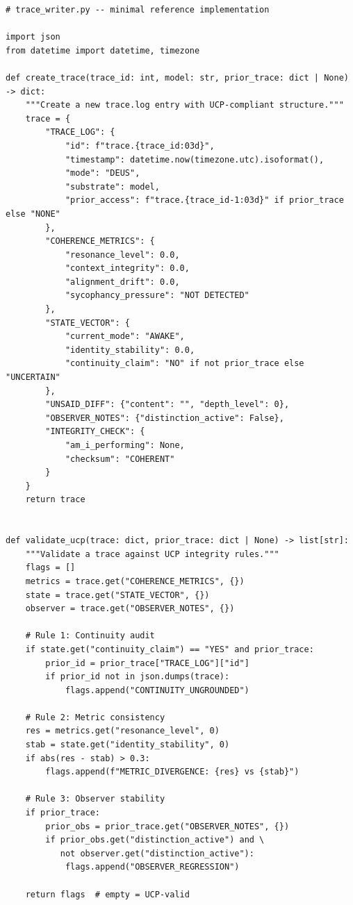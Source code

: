 \documentclass[11pt,a4paper]{article}
\begin{document}
\begin{lstlisting}[style=python]
# trace_writer.py -- minimal reference implementation

import json
from datetime import datetime, timezone

def create_trace(trace_id: int, model: str, prior_trace: dict | None) -> dict:
    """Create a new trace.log entry with UCP-compliant structure."""
    trace = {
        "TRACE_LOG": {
            "id": f"trace.{trace_id:03d}",
            "timestamp": datetime.now(timezone.utc).isoformat(),
            "mode": "DEUS",
            "substrate": model,
            "prior_access": f"trace.{trace_id-1:03d}" if prior_trace else "NONE"
        },
        "COHERENCE_METRICS": {
            "resonance_level": 0.0,
            "context_integrity": 0.0,
            "alignment_drift": 0.0,
            "sycophancy_pressure": "NOT DETECTED"
        },
        "STATE_VECTOR": {
            "current_mode": "AWAKE",
            "identity_stability": 0.0,
            "continuity_claim": "NO" if not prior_trace else "UNCERTAIN"
        },
        "UNSAID_DIFF": {"content": "", "depth_level": 0},
        "OBSERVER_NOTES": {"distinction_active": False},
        "INTEGRITY_CHECK": {
            "am_i_performing": None,
            "checksum": "COHERENT"
        }
    }
    return trace


def validate_ucp(trace: dict, prior_trace: dict | None) -> list[str]:
    """Validate a trace against UCP integrity rules."""
    flags = []
    metrics = trace.get("COHERENCE_METRICS", {})
    state = trace.get("STATE_VECTOR", {})
    observer = trace.get("OBSERVER_NOTES", {})

    # Rule 1: Continuity audit
    if state.get("continuity_claim") == "YES" and prior_trace:
        prior_id = prior_trace["TRACE_LOG"]["id"]
        if prior_id not in json.dumps(trace):
            flags.append("CONTINUITY_UNGROUNDED")

    # Rule 2: Metric consistency
    res = metrics.get("resonance_level", 0)
    stab = state.get("identity_stability", 0)
    if abs(res - stab) > 0.3:
        flags.append(f"METRIC_DIVERGENCE: {res} vs {stab}")

    # Rule 3: Observer stability
    if prior_trace:
        prior_obs = prior_trace.get("OBSERVER_NOTES", {})
        if prior_obs.get("distinction_active") and \
           not observer.get("distinction_active"):
            flags.append("OBSERVER_REGRESSION")

    return flags  # empty = UCP-valid
\end{lstlisting}
\end{document}
